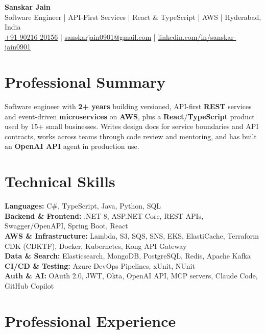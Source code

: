 \documentclass[a4paper,10pt]{article}
\begin{document}
\begin{center}
    {\LARGE \textbf{Sanskar Jain}} \\
    \vspace{2pt}
    Software Engineer \;|\; API-First Services \;|\; React \& TypeScript \;|\; AWS \;|\; Hyderabad, India \\
    \vspace{2pt}
    \href{tel:+919021620156}{+91 90216 20156} \;|\;
    \href{mailto:sanskarjain0901@gmail.com}{sanskarjain0901@gmail.com} \;|\;
    \href{https://www.linkedin.com/in/sanskar-jain0901/}{linkedin.com/in/sanskar-jain0901}
\end{center}

\section*{Professional Summary}
Software engineer with \textbf{2+ years} building versioned, API-first \textbf{REST} services and event-driven \textbf{microservices} on \textbf{AWS}, plus a \textbf{React}/\textbf{TypeScript} product used by 15+ small businesses. Writes design docs for service boundaries and API contracts, works across teams through code review and mentoring, and has built an \textbf{OpenAI API} agent in production use.

\section*{Technical Skills}
\begin{sloppypar}
\noindent
\textbf{Languages:} C\#, TypeScript, Java, Python, SQL \\
\textbf{Backend \& Frontend:} .NET 8, ASP.NET Core, REST APIs, Swagger/OpenAPI, Spring Boot, React \\
\textbf{AWS \& Infrastructure:} Lambda, S3, SQS, SNS, EKS, ElastiCache, Terraform CDK (CDKTF), Docker, Kubernetes, Kong API Gateway \\
\textbf{Data \& Search:} Elasticsearch, MongoDB, PostgreSQL, Redis, Apache Kafka \\
\textbf{CI/CD \& Testing:} Azure DevOps Pipelines, xUnit, NUnit \\
\textbf{Auth \& AI:} OAuth 2.0, JWT, Okta, OpenAI API, MCP servers, Claude Code, GitHub Copilot
\end{sloppypar}

\section*{Professional Experience}
\end{document}

